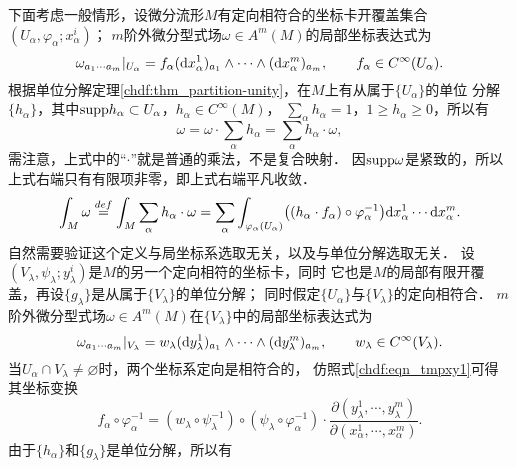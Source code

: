 下面考虑一般情形，设微分流形$M$有定向相符合的坐标卡开覆盖集合$(U_\alpha,\varphi_\alpha;x^i_\alpha)$；
$m$阶外微分型式场$\omega \in A^m(M)$的局部坐标表达式为
\begin{equation}
    \omega_{a_1 \cdots a_m}|_{U_\alpha} = f_{\alpha} ({\rm d}x^1_{\alpha})_{a_1}
       \wedge \cdots \wedge({\rm d}x^m_{\alpha})_{a_m},  \qquad f_{\alpha}\in C^\infty(U_\alpha).
\end{equation}
根据单位分解定理\ref{chdf:thm_partition-unity}，在$M$上有从属于$\{U_\alpha\}$的单位
分解$\{h_\alpha\}$，其中${\rm supp}h_\alpha \subset U_\alpha$，$h_\alpha \in C^\infty(M)$，
$\sum_{\alpha}h_\alpha =1$，$1 \geqslant h_\alpha \geqslant 0$，所以有
\begin{equation}
    \omega = \omega \cdot \sum_{\alpha} h_\alpha =  \sum_{\alpha}  h_\alpha \cdot \omega,
\end{equation}
需注意，上式中的“$\cdot$”就是普通的乘法，不是复合映射．
因${\rm supp}\omega$是紧致的，所以上式右端只有有限项非零，即上式右端平凡收敛．
\begin{equation}\label{chdf:eqn_def-integral-omega-partition}
    \int_{M} \omega \overset{def}{=} \int_{M} \sum_{\alpha}  h_\alpha \cdot \omega =
    \sum_{\alpha}\int_{\varphi_\alpha(U_\alpha)}
    \bigl( (h_\alpha \cdot f_\alpha )\circ\varphi^{-1}_\alpha\bigr)
    {\rm d}x^1_\alpha \cdots {\rm d}x^m_\alpha .
\end{equation}
自然需要验证这个定义与局坐标系选取无关，以及与单位分解选取无关．
设$(V_\lambda,\psi_\lambda;y^i_\lambda)$是$M$的另一个定向相符的坐标卡，同时
它也是$M$的局部有限开覆盖，再设$\{g_\lambda\}$是从属于$\{V_\lambda\}$的单位分解；
同时假定$\{U_\alpha\}$与$\{V_\lambda\}$的定向相符合．
$m$阶外微分型式场$\omega \in A^m(M)$在$\{V_\lambda\}$中的局部坐标表达式为
\begin{equation}
    \omega_{a_1 \cdots a_m}|_{V_\lambda} = w_{\lambda} ({\rm d}y^1_{\lambda})_{a_1}
    \wedge \cdots \wedge({\rm d}y^m_{\lambda})_{a_m},  \qquad w_{\lambda}\in C^\infty(V_\lambda).
\end{equation}
当$U_\alpha \cap V_\lambda \neq \varnothing$时，两个坐标系定向是相符合的，
仿照式\eqref{chdf:eqn_tmpxy1}可得其坐标变换
\begin{equation}\label{chdf:eqn_tmpxayl104}
    f_\alpha\circ\varphi_\alpha^{-1} = (w_\lambda \circ \psi^{-1}_\lambda )
      \circ (\psi_\lambda \circ \varphi^{-1}_\alpha)\cdot
    \frac{\partial (y^1_\lambda,\cdots, y^m_\lambda)}
    {\partial (x^1_\alpha, \cdots, x^m_\alpha)} .
\end{equation}
由于$\{h_\alpha\}$和$\{g_\lambda\}$是单位分解，所以有
